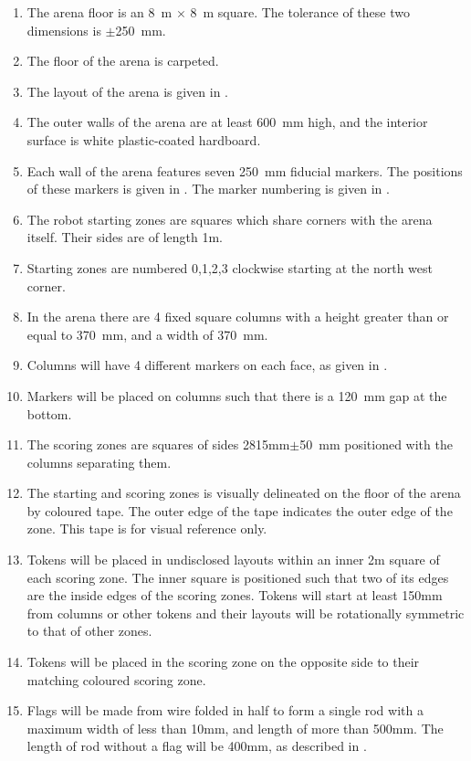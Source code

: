 \begin{enumerate}
  \item The arena floor is an \SI{8}{m} $\times$ \SI{8}{m} square. The tolerance
        of these two dimensions is $\pm$\SI{250}{mm}.
  \item The floor of the arena is carpeted.
  \item The layout of the arena is given in .
  \item The outer walls of the arena are at least \SI{600}{mm} high, and the
        interior surface is white plastic-coated hardboard.
  \item Each wall of the arena features seven \SI{250}{mm} fiducial markers.
        The positions of these markers is given in .
        The marker numbering is given in .
  \item The robot starting zones are squares which share corners with the arena
        itself. Their sides are of length \si{1}{m}.
  \item Starting zones are numbered 0,1,2,3 clockwise starting at the north west corner.
  \item In the arena there are 4 fixed square columns with a height greater than
        or equal to \SI{370}{mm}, and a width of \SI{370}{mm}.
  \item Columns will have 4 different markers on each face, as given in
        .
  \item Markers will be placed on columns such that there is a \SI{120}{mm} 
        gap at the bottom.
  \item The scoring zones are squares of sides \si{2815}{mm}$\pm$\SI{50}{mm}
        positioned with the columns separating them.
  \item The starting and scoring zones is visually delineated on the floor of
        the arena by coloured tape. The outer edge of the tape indicates the
        outer edge of the zone. This tape is for visual reference only.
  \item \label{spec:tokenpos} Tokens will be placed in undisclosed layouts
        within an inner \si{2}{m} square of each scoring zone. The inner square
        is positioned such that two of its edges are the inside edges of the
        scoring zones. Tokens will start at least \si{150}{mm} from columns
        or other tokens and their layouts will be rotationally symmetric to
        that of other zones.
  \item Tokens will be placed in the scoring zone on the opposite side to their
        matching coloured scoring zone.
  \item \label{spec:flags} Flags will be made from wire folded in half
        to form a single rod with a maximum width of less than \si{10}{mm},
        and length of more than \si{500}{mm}. The length of rod without
        a flag will be \si{400}{mm}, as described in .

\end{enumerate}

